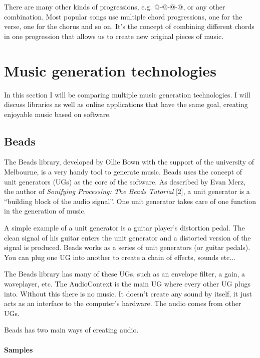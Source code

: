 \documentclass[12pt]{article}
\makeatletter
\newcommand*{\rom}[1]{\expandafter\@slowromancap\romannumeral #1@}
\makeatother
\begin{document}
There are many other kinds of progressions, e.g. \rom{1}-\rom{2}-\rom{5}-\rom{1}, or any other combination. Most popular songs use multiple chord progressions, one for the verse, one for the chorus and so on. It's the concept of combining different chords in one progression that allows us to create new original pieces of music.
\newpage

\section{Music generation technologies}

In this section I will be comparing multiple music generation technologies. I will discuss libraries as well as online applications that have the same goal, creating enjoyable music based on software.

\subsection{Beads}
The Beads library, developed by Ollie Bown with the support of the university of Melbourne, is a very handy tool to generate music. Beads uses the concept of unit generators (UGs) as the core of the software. As described by Evan Merz, the author of \textit{Sonifying Processing: The Beads Tutorial} [2], a unit generator is a ``building block of the audio signal''.  One unit generator takes care of one function in the generation of music. 
\newline

A simple example of a unit generator is a guitar player's distortion pedal. The clean signal of his guitar enters the unit generator and a distorted version of the signal is produced. Beads works as a series of unit generators (or guitar pedals). You can plug one UG into another to create a chain of effects, sounds etc... 
\newline

The Beads library has many of these UGs, such as an envelope filter, a gain, a waveplayer, etc. The AudioContext is the main UG where every other UG plugs into. Without this there is no music. It doesn't create any sound by itself, it just acts as an interface to the computer's hardware. The audio comes from other UGs.
\newline

Beads has two main ways of creating audio.

\paragraph{Samples}
\end{document}
